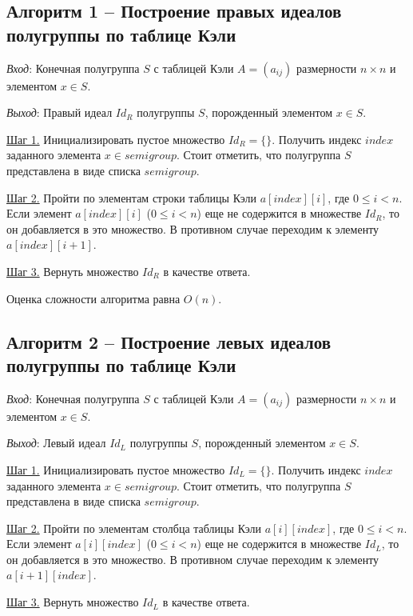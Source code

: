 \documentclass[bachelor, och, labwork]{shiza}
\begin{document}
    \subsection{Алгоритм 1 -- Построение правых идеалов полугруппы по таблице Кэли}

    \textit{Вход}: Конечная полугруппа $S$ с таблицей Кэли $A = (a_{ij})$ размерности $n \times n$ и элементом $x \in S$.

    \textit{Выход}: Правый идеал $Id_R$ полугруппы $S$, порожденный элементом $x \in S$.
    
    \underline{Шаг 1.} Инициализировать пустое множество $Id_R = \{\}$. Получить индекс $index$ заданного элемента $x \in semigroup$.
    Стоит отметить, что полугруппа $S$ представлена в виде списка $semigroup$.
    
    \underline{Шаг 2.} Пройти по элементам строки таблицы Кэли $a[index][i]$, где $0 \leq i < n$. Если элемент $a[index][i]$ ($0 \leq i < n$) еще не содержится
    в множестве $Id_R$, то он добавляется в это множество. В противном случае переходим к элементу $a[index][i + 1]$.
    
    \underline{Шаг 3.} Вернуть множество $Id_R$ в качестве ответа.
    
      Оценка сложности алгоритма равна $O(n)$.

      \subsection{Алгоритм 2 -- Построение левых идеалов полугруппы по таблице Кэли}

    \textit{Вход}: Конечная полугруппа $S$ с таблицей Кэли $A = (a_{ij})$ размерности $n \times n$ и элементом $x \in S$.

    \textit{Выход}: Левый идеал $Id_L$ полугруппы $S$, порожденный элементом $x \in S$.
    
    \underline{Шаг 1.} Инициализировать пустое множество $Id_L = \{\}$. Получить индекс $index$ заданного элемента $x \in semigroup$.
    Стоит отметить, что полугруппа $S$ представлена в виде списка $semigroup$.
    
    \underline{Шаг 2.} Пройти по элементам столбца таблицы Кэли $a[i][index]$, где $0 \leq i < n$. Если элемент $a[i][index]$ ($0 \leq i < n$)
    еще не содержится в множестве $Id_L$, то он добавляется в это множество. В противном случае переходим к элементу $a[i + 1][index]$.
    
    \underline{Шаг 3.} Вернуть множество $Id_L$ в качестве ответа.
    
\end{document}
